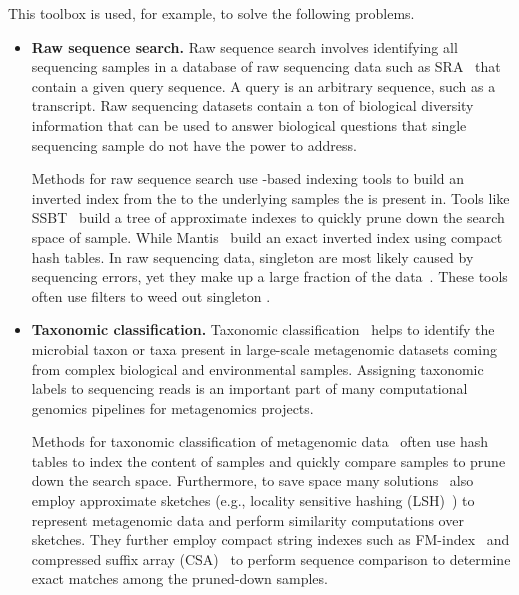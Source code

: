 \begin{itemize}[leftmargin=*]
\end{itemize}

This toolbox is used, for example, to solve the following problems.

\begin{itemize}[leftmargin=*]
\item {\bf Raw sequence search.} Raw sequence search involves  identifying all sequencing samples in a database of raw sequencing data such as SRA~\cite{kodama2012sequence} that contain a given query sequence. A query is an arbitrary sequence, such as a transcript. Raw sequencing datasets contain a ton of biological diversity information that can be used to answer biological questions that single sequencing sample do not have the power to address.

Methods for raw sequence search use \kmer-based indexing tools to build an inverted index from the \kmers to the underlying samples the \kmer is present in. Tools like SSBT~\cite{SolomonKi16} build a tree of approximate \kmer indexes to quickly prune down the search space of sample. While Mantis~\cite{PandeyABFJP18Cell} build an exact inverted index using compact hash tables.
In raw sequencing data, singleton \kmers are most likely caused by sequencing errors, yet they make up a large fraction of the data~\cite{solomon2016fast,MarccaisKi11}. These tools often use filters to weed out singleton \kmers.

\item {\bf Taxonomic classification.} Taxonomic classification~\cite{wood2014kraken} helps to identify the microbial taxon or taxa present in large-scale  metagenomic datasets coming from complex biological and environmental samples. Assigning taxonomic labels to sequencing reads is an important part of many computational genomics pipelines for metagenomics
projects.

Methods for taxonomic classification of metagenomic data~\cite{wood2014kraken} often use hash tables to index the \kmer content of samples and quickly compare samples to prune down the search space.
Furthermore, to save space many solutions~\cite{wood2019improved} also employ approximate sketches (e.g., locality sensitive hashing (LSH)~\cite{roberts2004reducing}) to represent metagenomic data and perform similarity computations over sketches.
They further employ compact string indexes such as FM-index~\cite{ferragina2000opportunistic} and compressed suffix array (CSA)~\cite{grossi2000compressed} to perform sequence comparison to determine exact matches among the pruned-down samples.


\end{itemize}
